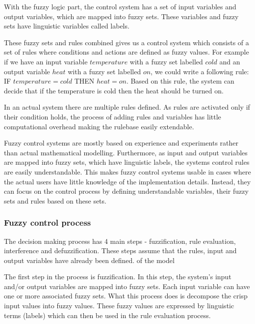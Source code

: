 With the fuzzy logic part, the control system has a set of input variables and output variables, which are mapped into fuzzy sets. These variables and fuzzy sets have linguistic variables called labels. 

These fuzzy sets and rules combined gives us a control system which consists of a set of rules where conditions and actions are defined as fuzzy values. For example if we have an input variable $temperature$ with a fuzzy set labelled $cold$ and an output variable $heat$ with a fuzzy set labelled $on$, we could write a following rule: IF $temperature = cold$ THEN $heat = on$. Based on this rule, the system can decide that if the temperature is cold then the heat should be turned on. 

In an actual system there are multiple rules defined. As rules are activated only if their condition holds, the process of adding rules and variables has little computational overhead making the rulebase easily extendable.

Fuzzy control systems are mostly based on experience and experiments rather than actual mathematical modelling. Furthermore, as input and output variables are mapped into fuzzy sets, which have linguistic labels, the systems control rules are easily understandable. This makes fuzzy control systems usable in cases where the actual users have little knowledge of the implementation details. Instead, they can focus on the control process by defining understandable variables, their fuzzy sets and rules based on these sets. 

\subsubsection{Fuzzy control process}

The decision making process has 4 main steps - fuzzification, rule evaluation, interference and defuzzification. These steps assume that the rules, input and output variables have already been defined.  of the model

The first step in the process is fuzzification. In this step, the system's input and/or output variables are mapped into fuzzy sets. Each input variable can have one or more associated fuzzy sets. What this process does is decompose the crisp input values into fuzzy values. These fuzzy values are expressed by linguistic terms (labels) which can then be used in the rule evaluation process.

